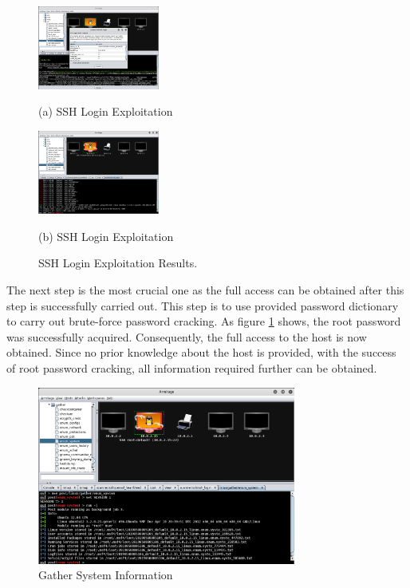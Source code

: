 \documentclass{article}
\begin{document}
\begin{figure}[H]
  \begin{minipage}[b]{.48\linewidth}
    \centering
    \centerline{\includegraphics[width=4.0cm]{kali7}}
    \centerline{(a) SSH Login Exploitation}\medskip
  \end{minipage}
  \hfill
  \begin{minipage}[b]{0.48\linewidth}
    \centering
    \centerline{\includegraphics[width=4.0cm]{kali8}}
    \centerline{(b) SSH Login Exploitation}\medskip
  \end{minipage}
  \caption{SSH Login Exploitation Results.}
  \label{kali7-8}
  \end{figure}
The next step is the most crucial one as the full access can be obtained after this step is successfully 
carried out. This step is to use provided password dictionary to carry out brute-force password cracking.
As figure \ref{kali7-8} shows, the root password was successfully acquired. Consequently, the full access to 
the host is now obtained.
Since no prior knowledge about the host is provided, with the success of root password cracking, 
all information required further can be obtained.

\begin{figure}[H]
  \includegraphics[width=8.5cm]{kali9}
  \caption{Gather System Information}
  \label{kali9}
\end{figure}
\end{document}
